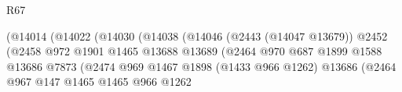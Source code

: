 \begin{lexlean}{R67}
\begin{coremodule}
                                                            (@14014
                                                              (@14022
                                                                (@14030
                                                                  (@14038
                                                                    (@14046
                                                                      (@2443 (@14047 @13679))
                                                                      @2452
                                                                      (@2458
                                                                        @972
                                                                        @1901
                                                                        @1465
                                                                        @13688
                                                                        @13689
                                                                        (@2464
                                                                          @970
                                                                          @687
                                                                          @1899
                                                                          @1588
                                                                          @13686
                                                                          @7873
                                                                          (@2474
                                                                            @969
                                                                            @1467
                                                                            @1898
                                                                            (@1433 @966 @1262)
                                                                            @13686
                                                                            (@2464
                                                                              @967
                                                                              @147
                                                                              @1465
                                                                              @1465
                                                                              @966
                                                                              @1262

\end{coremodule}
\end{lexlean}
